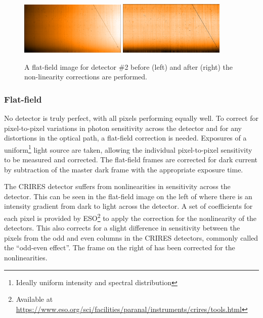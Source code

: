 \begin{figure}[h]
    \centering
        \includegraphics[width=0.45\textwidth]{figures/reduction/Flat_2.png} %
        \includegraphics[width=0.45\textwidth]{figures/reduction/FlatR_2.png} %
    \caption{A flat-field image for detector \#2 before (left) and after (right) the non-linearity corrections are performed.}
    \label{fig:masterflats_colour}
\end{figure}


\subsubsection{Flat-field}
\label{subsec:flat-field}
No detector is truly perfect, with all pixels performing equally well. To correct for pixel-to-pixel variations in photon sensitivity across the detector and for any distortions in the optical path, a flat-field correction is needed. Exposures of a uniform\footnote{Ideally uniform intensity and spectral distribution} light source are taken, allowing the individual pixel-to-pixel sensitivity to be measured and corrected. The flat-field frames are corrected for dark current by subtraction of the master dark frame with the appropriate exposure time.

The {CRIRES} detector suffers from nonlinearities in sensitivity across the detector. This can be seen in the flat-field image on the left of  where there is an intensity gradient from dark to light across the detector. A set of coefficients for each pixel is provided by {ESO}\footnote{Available at \href{https://www.eso.org/sci/facilities/paranal/instruments/crires/tools.html}{https://www.eso.org/sci/facilities/paranal/instruments/crires/tools.html}} to apply the correction for the nonlinearity of the detectors. This also corrects for a slight difference in sensitivity between the pixels from the odd and even columns in the {CRIRES} detectors, commonly called the ``odd-even effect''. The frame on the right of  has been corrected for the nonlinearities.

